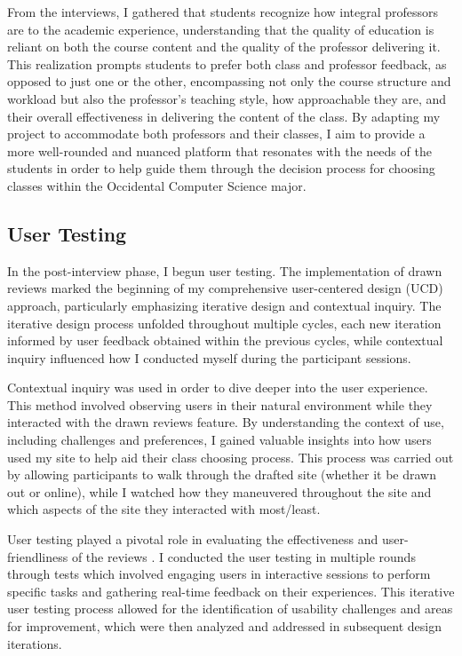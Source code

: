 \documentclass[10pt,twocolumn]{article}
\begin{document}
From the interviews, I gathered that students recognize how integral professors are to the academic experience, understanding that the quality of education is reliant on both the course content and the quality of the professor delivering it. This realization prompts students to prefer both class and professor feedback, as opposed to just one or the other, encompassing not only the course structure and workload but also the professor's teaching style, how approachable they are, and their overall effectiveness in delivering the content of the class. By adapting my project to accommodate both professors and their classes, I aim to provide a more well-rounded and nuanced platform that resonates with the needs of the students in order to help guide them through the decision process for choosing classes within the Occidental Computer Science major.


\subsection{User Testing}

In the post-interview phase, I begun user testing. The implementation of drawn reviews marked the beginning of my comprehensive user-centered design (UCD) approach, particularly emphasizing iterative design and contextual inquiry. The iterative design process unfolded throughout multiple cycles, each new iteration informed by user feedback obtained within the previous cycles, while contextual inquiry influenced how I conducted myself during the participant sessions.

Contextual inquiry was used in order to dive deeper into the user experience. This method involved observing users in their natural environment while they interacted with the drawn reviews feature. By understanding the context of use, including challenges and preferences, I gained valuable insights into how users used my site to help aid their class choosing process. This process was carried out by allowing participants to walk through the drafted site (whether it be drawn out or online), while I watched how they maneuvered throughout the site and which aspects of the site they interacted with most/least.

User testing played a pivotal role in evaluating the effectiveness and user-friendliness of the reviews \cite{mao2005}. I conducted the user testing in multiple rounds through tests which involved engaging users in interactive sessions to perform specific tasks and gathering real-time feedback on their experiences. This iterative user testing process allowed for the identification of usability challenges and areas for improvement, which were then analyzed and addressed in subsequent design iterations. 
\end{document}
